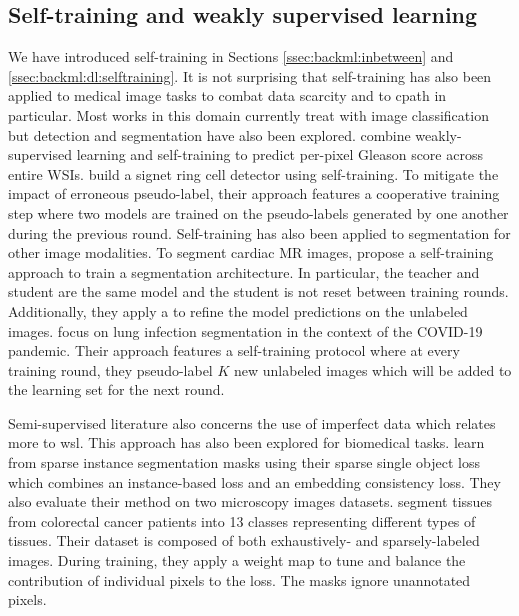 \subsection{Self-training and weakly supervised learning}
\label{ssec:backdp:st}

We have introduced self-training in Sections \ref{ssec:backml:inbetween} and \ref{ssec:backml:dl:selftraining}. It is not surprising that self-training has also been applied to medical image tasks to combat data scarcity \cite{tajbakhsh2020embracing, peng2021medical} and to \acrlong{cpath} in particular. Most works in this domain currently treat with image classification \cite{peikari2018cluster, su2019local, koohbanani2021self, jaiswal2019semi, shaw2020teacher} but detection and segmentation have also been explored. \cite{li2018based} combine weakly-supervised learning and self-training to predict per-pixel Gleason score across entire WSIs. \cite{li2019signet} build a signet ring cell detector using self-training. To mitigate the impact of erroneous pseudo-label, their approach features a cooperative training step where two models are trained on the pseudo-labels generated by one another during the previous round. Self-training has also been applied to segmentation for other image modalities. To segment cardiac MR images, \cite{bai2017semi} propose a self-training approach to train a segmentation architecture. In particular, the teacher and student are the same model and the student is not reset between training rounds. Additionally, they apply a  to refine the model predictions on the unlabeled images. \cite{fan2020inf} focus on lung infection segmentation in the context of the COVID-19 pandemic. Their approach features a self-training protocol where at every training round, they pseudo-label $K$ new unlabeled images which will be added to the learning set for the next round. 

Semi-supervised literature also concerns the use of imperfect data which relates more to \acrlong{wsl}. This approach has also been explored for biomedical tasks. \cite{wolny2021sparse} learn from sparse instance segmentation masks using their sparse single object loss which combines an instance-based loss and an embedding consistency loss. They also evaluate their method on two microscopy images datasets. \cite{bokhorst2018learning} segment tissues from colorectal cancer patients into 13 classes representing different types of tissues. Their dataset is composed of both exhaustively- and sparsely-labeled images. During training, they apply a weight map to tune and balance the contribution of individual pixels to the loss. The masks ignore unannotated pixels.


